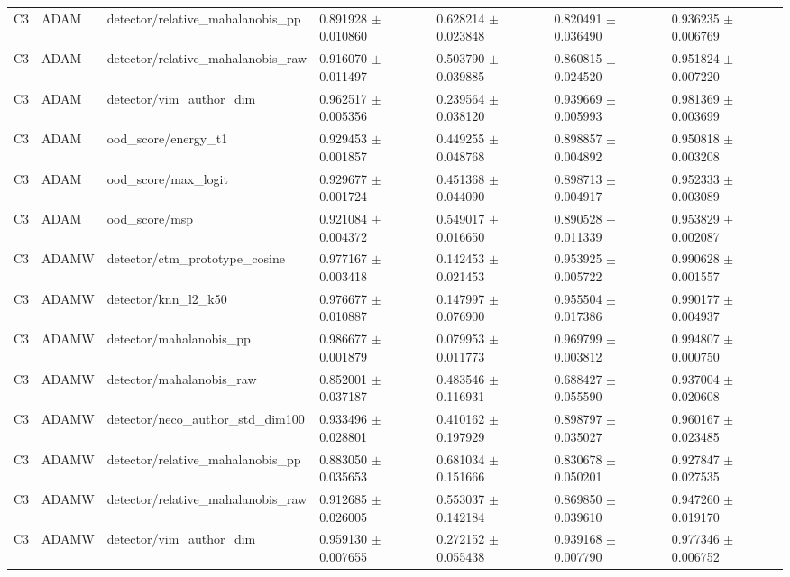 \begin{longtable}{lllllll}
C3 & ADAM & detector/relative\_mahalanobis\_pp & 0.891928 $\pm$ 0.010860 & 0.628214 $\pm$ 0.023848 & 0.820491 $\pm$ 0.036490 & 0.936235 $\pm$ 0.006769 \\
C3 & ADAM & detector/relative\_mahalanobis\_raw & 0.916070 $\pm$ 0.011497 & 0.503790 $\pm$ 0.039885 & 0.860815 $\pm$ 0.024520 & 0.951824 $\pm$ 0.007220 \\
C3 & ADAM & detector/vim\_author\_dim & 0.962517 $\pm$ 0.005356 & 0.239564 $\pm$ 0.038120 & 0.939669 $\pm$ 0.005993 & 0.981369 $\pm$ 0.003699 \\
C3 & ADAM & ood\_score/energy\_t1 & 0.929453 $\pm$ 0.001857 & 0.449255 $\pm$ 0.048768 & 0.898857 $\pm$ 0.004892 & 0.950818 $\pm$ 0.003208 \\
C3 & ADAM & ood\_score/max\_logit & 0.929677 $\pm$ 0.001724 & 0.451368 $\pm$ 0.044090 & 0.898713 $\pm$ 0.004917 & 0.952333 $\pm$ 0.003089 \\
C3 & ADAM & ood\_score/msp & 0.921084 $\pm$ 0.004372 & 0.549017 $\pm$ 0.016650 & 0.890528 $\pm$ 0.011339 & 0.953829 $\pm$ 0.002087 \\
C3 & ADAMW & detector/ctm\_prototype\_cosine & 0.977167 $\pm$ 0.003418 & 0.142453 $\pm$ 0.021453 & 0.953925 $\pm$ 0.005722 & 0.990628 $\pm$ 0.001557 \\
C3 & ADAMW & detector/knn\_l2\_k50 & 0.976677 $\pm$ 0.010887 & 0.147997 $\pm$ 0.076900 & 0.955504 $\pm$ 0.017386 & 0.990177 $\pm$ 0.004937 \\
C3 & ADAMW & detector/mahalanobis\_pp & 0.986677 $\pm$ 0.001879 & 0.079953 $\pm$ 0.011773 & 0.969799 $\pm$ 0.003812 & 0.994807 $\pm$ 0.000750 \\
C3 & ADAMW & detector/mahalanobis\_raw & 0.852001 $\pm$ 0.037187 & 0.483546 $\pm$ 0.116931 & 0.688427 $\pm$ 0.055590 & 0.937004 $\pm$ 0.020608 \\
C3 & ADAMW & detector/neco\_author\_std\_dim100 & 0.933496 $\pm$ 0.028801 & 0.410162 $\pm$ 0.197929 & 0.898797 $\pm$ 0.035027 & 0.960167 $\pm$ 0.023485 \\
C3 & ADAMW & detector/relative\_mahalanobis\_pp & 0.883050 $\pm$ 0.035653 & 0.681034 $\pm$ 0.151666 & 0.830678 $\pm$ 0.050201 & 0.927847 $\pm$ 0.027535 \\
C3 & ADAMW & detector/relative\_mahalanobis\_raw & 0.912685 $\pm$ 0.026005 & 0.553037 $\pm$ 0.142184 & 0.869850 $\pm$ 0.039610 & 0.947260 $\pm$ 0.019170 \\
C3 & ADAMW & detector/vim\_author\_dim & 0.959130 $\pm$ 0.007655 & 0.272152 $\pm$ 0.055438 & 0.939168 $\pm$ 0.007790 & 0.977346 $\pm$ 0.006752 \\

\end{longtable}
